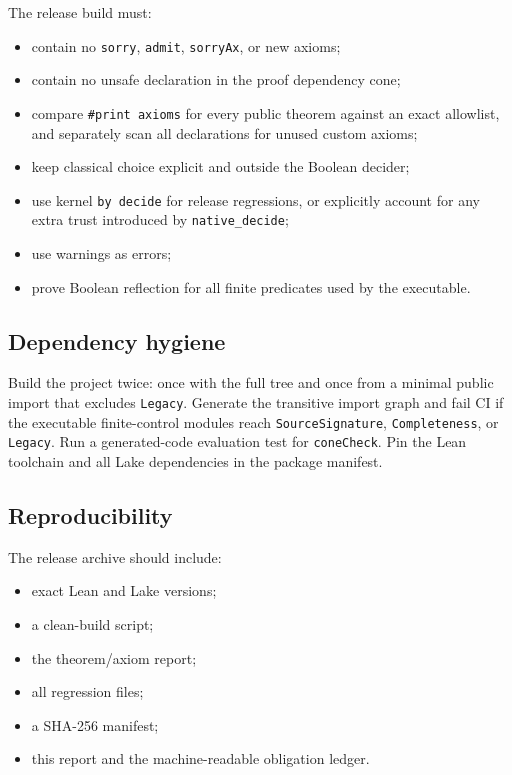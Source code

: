 \documentclass[11pt]{article}
\begin{document}
The release build must:

\begin{itemize}
  \item contain no \texttt{sorry}, \texttt{admit}, \texttt{sorryAx}, or new axioms;
  \item contain no unsafe declaration in the proof dependency cone;
  \item compare \texttt{\#print axioms} for every public theorem against an exact
        allowlist, and separately scan all declarations for unused custom axioms;
  \item keep classical choice explicit and outside the Boolean decider;
  \item use kernel \texttt{by decide} for release regressions, or explicitly account for
        any extra trust introduced by \texttt{native\_decide};
  \item use warnings as errors;
  \item prove Boolean reflection for all finite predicates used by the executable.
\end{itemize}

\subsection{Dependency hygiene}

Build the project twice: once with the full tree and once from a minimal public import
that excludes \texttt{Legacy}. Generate the transitive import graph and fail CI if the
executable finite-control modules reach \texttt{SourceSignature}, \texttt{Completeness},
or \texttt{Legacy}. Run a generated-code evaluation test for \texttt{coneCheck}. Pin the
Lean toolchain and all Lake dependencies in the package manifest.

\subsection{Reproducibility}

The release archive should include:

\begin{itemize}
  \item exact Lean and Lake versions;
  \item a clean-build script;
  \item the theorem/axiom report;
  \item all regression files;
  \item a SHA-256 manifest;
  \item this report and the machine-readable obligation ledger.
\end{itemize}
\end{document}
